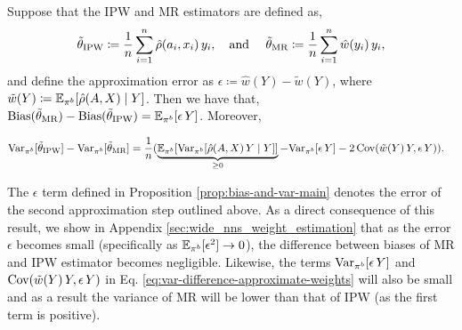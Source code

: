 \begin{proposition}\label{prop:bias-and-var-main}
Suppose that the IPW and MR estimators are defined as,
\[
\tilde{\theta}_{\textup{IPW}} \coloneqq \frac{1}{n}\sum_{i=1}^n\hat{\rho}(a_i, x_i)\, y_i, \quad \textup{and }\quad \tilde{\theta}_{\textup{MR}} \coloneqq \frac{1}{n}\sum_{i=1}^n\hat{w}(y_i)\, y_i,
\]
and define the approximation error as $\epsilon \coloneqq \hat{w}(Y) - \tilde{w}(Y)$, where $\tilde{w}(Y) \coloneqq \mathbb{E}_{\pi^b}[\hat{\rho}(A, X)\mid Y]$. Then we have that, $\textup{Bias}(\tilde{\theta}_{\textup{MR}}) - \textup{Bias}(\tilde{\theta}_{\textup{IPW}}) = \mathbb{E}_{\pi^b}[\epsilon\,Y]$. Moreover,
\begin{small}
\begin{align}
    \textup{Var}_{\pi^b}[\tilde{\theta}_{\textup{IPW}}] - \textup{Var}_{\pi^b}[\tilde{\theta}_{\textup{MR}}]
    &= \frac{1}{n}(\underbrace{\mathbb{E}_{\pi^b}[\textup{Var}_{\pi^b}[\hat{\rho}(A, X)\,Y\mid Y]]}_{\geq 0} - \textup{Var}_{\pi^b}[\epsilon\,Y] - 2\,\textup{Cov}(\tilde{w}(Y)\,Y, \epsilon\,Y)). \label{eq:var-difference-approximate-weights}
\end{align}
\end{small}
\end{proposition}
 The $\epsilon$ term defined in Proposition \ref{prop:bias-and-var-main} denotes the error of the second approximation step outlined above. 
As a direct consequence of this result, we show in Appendix \ref{sec:wide_nns_weight_estimation} that as the error $\epsilon$ becomes small (specifically as $\mathbb{E}_{\pi^b}[\epsilon^2]\rightarrow 0$), the difference between biases of MR and IPW estimator becomes negligible.
Likewise, the terms $\textup{Var}_{\pi^b}[\epsilon\,Y]$ and $\textup{Cov}(\tilde{w}(Y)\,Y, \epsilon\,Y)$ in Eq. \eqref{eq:var-difference-approximate-weights} will also be small and as a result the variance of MR will be lower than that of IPW (as the first term is positive). 

